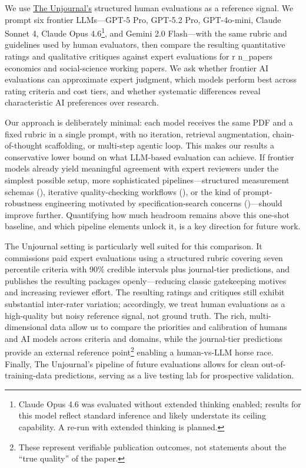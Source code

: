\documentclass[
  11pt,
  letterpaper,
]{article}
\begin{document}
We use \href{https://www.unjournal.org/}{The Unjournal's} structured
human evaluations as a reference signal. We prompt six frontier
LLMs---GPT-5 Pro, GPT-5.2 Pro, GPT-4o-mini, Claude Sonnet 4, Claude Opus
4.6\footnote{Claude Opus 4.6 was evaluated without extended thinking
  enabled; results for this model reflect standard inference and likely
  understate its ceiling capability. A re-run with extended thinking is
  planned.}, and Gemini 2.0 Flash---with the same rubric and guidelines
used by human evaluators, then compare the resulting quantitative
ratings and qualitative critiques against expert evaluations for r
n\_papers economics and social-science working papers. We ask whether
frontier AI evaluations can approximate expert judgment, which models
perform best across rating criteria and cost tiers, and whether
systematic differences reveal characteristic AI preferences over
research.

Our approach is deliberately minimal: each model receives the same PDF
and a fixed rubric in a single prompt, with no iteration, retrieval
augmentation, chain-of-thought scaffolding, or multi-step agentic loop.
This makes our results a conservative lower bound on what LLM-based
evaluation can achieve. If frontier models already yield meaningful
agreement with expert reviewers under the simplest possible setup, more
sophisticated pipelines---structured measurement schemas
(), iterative quality-checking workflows
(), or the kind of
prompt-robustness engineering motivated by specification-search concerns
()---should improve further. Quantifying how much headroom
remains above this one-shot baseline, and which pipeline elements unlock
it, is a key direction for future work.

The Unjournal setting is particularly well suited for this comparison.
It commissions paid expert evaluations using a structured rubric
covering seven percentile criteria with 90\% credible intervals plus
journal-tier predictions, and publishes the resulting packages
openly---reducing classic gatekeeping motives and increasing reviewer
effort. The resulting ratings and critiques still exhibit substantial
inter-rater variation; accordingly, we treat human evaluations as a
high-quality but noisy reference signal, not ground truth. The rich,
multi-dimensional data allow us to compare the priorities and
calibration of humans and AI models across criteria and domains, while
the journal-tier predictions provide an external reference
point\footnote{These represent verifiable publication outcomes, not
  statements about the ``true quality'' of the paper.} enabling a
human-vs-LLM horse race. Finally, The Unjournal's pipeline of future
evaluations allows for clean out-of-training-data predictions, serving
as a live testing lab for prospective validation.
\end{document}
